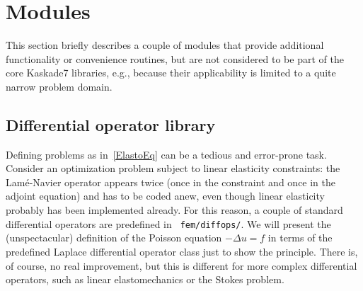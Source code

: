 \documentclass[11pt]{article}
\begin{document}
\section{Modules} \label{moduls}

This section briefly describes a couple of modules that provide additional functionality or convenience routines, but are not considered 
to be part of the core Kaskade7 libraries, e.g., because their applicability is limited to a quite narrow problem domain.

\subsection{Differential operator library} \label{subsec:diffops}
Defining problems as in~\ref{ElastoEq} can be a tedious and error-prone task. Consider an optimization problem subject to 
linear elasticity constraints: the Lam\'{e}-Navier operator appears twice (once in the constraint and once in the adjoint equation) 
and has to be coded anew, even though linear elasticity probably has been implemented already. For this reason, a couple of 
standard differential operators are predefined in \verb+ fem/diffops/+. We will present the (unspectacular) definition of the 
Poisson equation $-\Delta u = f$ in terms of the predefined Laplace differential operator class just to show the principle. 
There is, of course, no real improvement, but this is different for more complex differential operators, such as linear 
elastomechanics or the Stokes problem.
\end{document}
